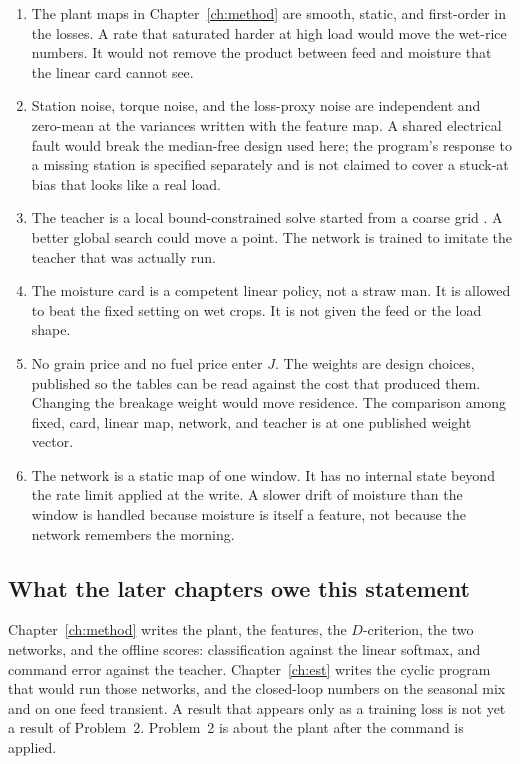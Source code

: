 \begin{enumerate}[label=A\arabic*.]
\item The plant maps in Chapter~\ref{ch:method} are smooth, static, and first-order in the losses. A rate that saturated harder at high load would move the wet-rice numbers. It would not remove the product between feed and moisture that the linear card cannot see.
\item Station noise, torque noise, and the loss-proxy noise are independent and zero-mean at the variances written with the feature map. A shared electrical fault would break the median-free design used here; the program's response to a missing station is specified separately and is not claimed to cover a stuck-at bias that looks like a real load.
\item The teacher is a local bound-constrained solve started from a coarse grid \cite{nocedal2006}. A better global search could move a point. The network is trained to imitate the teacher that was actually run.
\item The moisture card is a competent linear policy, not a straw man. It is allowed to beat the fixed setting on wet crops. It is not given the feed or the load shape.
\item No grain price and no fuel price enter \(J\). The weights are design choices, published so the tables can be read against the cost that produced them. Changing the breakage weight would move residence. The comparison among fixed, card, linear map, network, and teacher is at one published weight vector.
\item The network is a static map of one window. It has no internal state beyond the rate limit applied at the write. A slower drift of moisture than the window is handled because moisture is itself a feature, not because the network remembers the morning.
\end{enumerate}

\subsection{What the later chapters owe this statement}

Chapter~\ref{ch:method} writes the plant, the features, the \(D\)-criterion, the two networks, and the offline scores: classification against the linear softmax, and command error against the teacher. Chapter~\ref{ch:est} writes the cyclic program that would run those networks, and the closed-loop numbers on the seasonal mix and on one feed transient. A result that appears only as a training loss is not yet a result of Problem~2. Problem~2 is about the plant after the command is applied.
